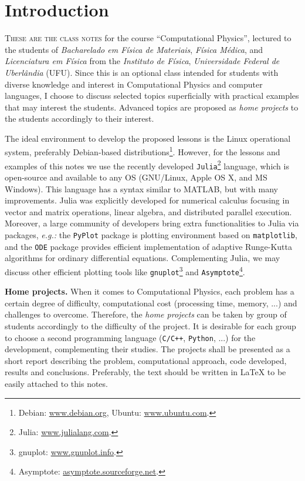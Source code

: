 \chapter*{Introduction}

\lettrine[nindent=0.35em,lhang=0.40,loversize=0.3]{T}{hese are the class notes} for the course ``Computational Physics'', lectured to the students of \textit{Bacharelado em Física de Materiais}, \textit{Física Médica}, and \textit{Licenciatura em Física} from the \textit{Instituto de Física}, \textit{Universidade Federal de Uberlândia} (UFU). Since this is an optional class intended for students with diverse knowledge and interest in Computational Physics and computer languages, I choose to discuss selected topics superficially with practical examples that may interest the students. Advanced topics are proposed as \textit{home projects} to the students accordingly to their interest. 

The ideal environment to develop the proposed lessons is the Linux operational system, preferably Debian-based distributions\footnote{Debian: \url{www.debian.org}, Ubuntu: \url{www.ubuntu.com}.}. However, for the lessons and examples of this notes we use the recently developed \texttt{Julia}\footnote{Julia: \url{www.julialang.com}.} language, which is open-source and available to any OS (GNU/Linux, Apple OS X, and MS Windows). This language has a syntax similar to MATLAB, but with many improvements. Julia was explicitly developed for numerical calculus focusing in vector and matrix operations, linear algebra, and distributed parallel execution. Moreover, a large community of developers bring extra functionalities to Julia via packages, \textit{e.g.:} the \texttt{PyPlot} package is plotting environment based on \texttt{matplotlib}, and the \texttt{ODE} package provides efficient implementation of adaptive Runge-Kutta algorithms for ordinary differential equations. Complementing Julia, we may discuss other efficient plotting tools like \texttt{gnuplot}\footnote{gnuplot: \url{www.gnuplot.info}.} and \texttt{Asymptote}\footnote{Asymptote: \url{asymptote.sourceforge.net}.}.

\textbf{Home projects.} When it comes to Computational Physics, each problem has a certain degree of difficulty, computational cost (processing time, memory, ...) and challenges to overcome. Therefore, the \textit{home projects} can be taken by group of students accordingly to the difficulty of the project. It is desirable for each group to choose a second programming language (\texttt{C/C++}, \texttt{Python}, ...) for the development, complementing their studies. The projects shall be presented as a short report describing the problem, computational approach, code developed, results and conclusions. Preferably, the text should be written in \LaTeX\xspace to be easily attached to this notes.

